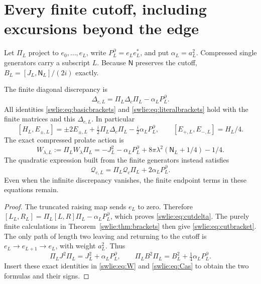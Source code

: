 \section{Every finite cutoff, including excursions beyond the edge}

Let $\Pi_L$ project to $e_0,\ldots,e_L$, write
$P_L^\partial=e_Le_L^*$, and put $\alpha_L=a_L^2$.
Compressed single generators carry a subscript $L$.
Because $\mathsf N$ preserves the cutoff,
$B_L=[J_L,\mathsf N_L]/(2i)$ exactly.

\begin{swlietheorem}\label{swlie:thm:cutoff}
The finite diagonal discrepancy is
\begin{equation}\label{swlie:eq:cutdelta}
 \Delta_{c,L}=\Pi_L\Delta_c\Pi_L-\alpha_LP_L^\partial.
\end{equation}
All identities \eqref{swlie:eq:basicbrackets} and
\eqref{swlie:eq:literalbrackets} hold with the finite matrices and
this $\Delta_{c,L}$. In particular
\begin{equation}\label{swlie:eq:cutbracket}
 [H_L,E_{\pm,L}]
 =\pm2E_{\pm,L}+\tfrac i2\Pi_L\Delta_c\Pi_L
                         -\tfrac i2\alpha_LP_L^\partial,
 \qquad [E_{+,L},E_{-,L}]=H_L/4.
\end{equation}
The exact compressed prolate action is
\begin{equation}\label{swlie:eq:cutprolate}
 \boxed{\quad
 W_{\lambda,L}:=\Pi_LW_\lambda\Pi_L
 =-J_L^2-\alpha_LP_L^\partial
        +8\pi\lambda^2(\mathsf N_L+1/4)-1/4.\quad}
\end{equation}
The quadratic expression built from the finite generators
instead satisfies
\begin{equation}\label{swlie:eq:cutcas}
 \mathcal Q_{c,L}=\Pi_L\mathcal Q_c\Pi_L
                                   +2\alpha_LP_L^\partial.
\end{equation}
Even when the infinite discrepancy vanishes,
the finite endpoint terms in these equations remain.
\end{swlietheorem}
\begin{proof}
The truncated raising map sends $e_L$ to zero.
Therefore $[L_L,R_L]=\Pi_L[L,R]\Pi_L-\alpha_LP_L^\partial$,
which proves \eqref{swlie:eq:cutdelta}. The purely finite
calculations in Theorem~\ref{swlie:thm:brackets} then give
\eqref{swlie:eq:cutbracket}. The only path of length two
leaving and returning to the cutoff is
$e_L\to e_{L+1}\to e_L$, with weight $a_L^2$.
Thus
\[
 \Pi_LJ^2\Pi_L=J_L^2+\alpha_LP_L^\partial,\qquad
 \Pi_LB^2\Pi_L=B_L^2+\tfrac14\alpha_LP_L^\partial.
\]
Insert these exact identities in \eqref{swlie:eq:W} and
\eqref{swlie:eq:Cas} to obtain the two formulas and their signs.
\end{proof}

